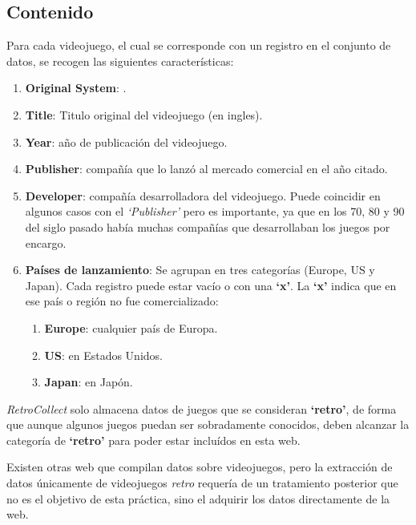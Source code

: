 \documentclass[]{article}
\providecommand{\tightlist}{%
  \setlength{\itemsep}{0pt}\setlength{\parskip}{0pt}}
\begin{document}
\subsection{Contenido}\label{contenido}

Para cada videojuego, el cual se corresponde con un registro en el
conjunto de datos, se recogen las siguientes características:

\begin{enumerate}
\def\labelenumi{\arabic{enumi}.}
\tightlist
\item
  \textbf{Original System}: .
\item
  \textbf{Title}: Titulo original del videojuego (en ingles).
\item
  \textbf{Year}: año de publicación del videojuego.
\item
  \textbf{Publisher}: compañía que lo lanzó al mercado comercial en el
  año citado.
\item
  \textbf{Developer}: compañía desarrolladora del videojuego. Puede
  coincidir en algunos casos con el \emph{`Publisher'} pero es
  importante, ya que en los 70, 80 y 90 del siglo pasado había muchas
  compañías que desarrollaban los juegos por encargo.
\item
  \textbf{Países de lanzamiento}: Se agrupan en tres categorías (Europe,
  US y Japan). Cada registro puede estar vacío o con una \textbf{`x'}.
  La \textbf{`x'} indica que en ese país o región no fue comercializado:

  \begin{enumerate}
  \def\labelenumii{\arabic{enumii}.}
  \tightlist
  \item
    \textbf{Europe}: cualquier país de Europa.\\
  \item
    \textbf{US}: en Estados Unidos.\\
  \item
    \textbf{Japan}: en Japón.
  \end{enumerate}
\end{enumerate}

\emph{RetroCollect} solo almacena datos de juegos que se consideran
\textbf{`retro'}, de forma que aunque algunos juegos puedan ser
sobradamente conocidos, deben alcanzar la categoría de \textbf{`retro'}
para poder estar incluídos en esta web.

Existen otras web que compilan datos sobre videojuegos, pero la
extracción de datos únicamente de videojuegos \emph{retro} requería de
un tratamiento posterior que no es el objetivo de esta práctica, sino el
adquirir los datos directamente de la web.
\end{document}
